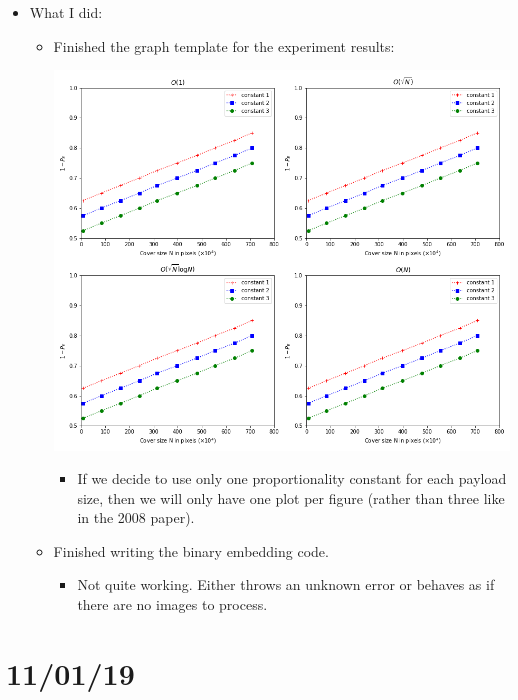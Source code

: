 \documentclass[11pt,a4paper]{report}
\begin{document}
\begin{itemize}

  \item What I did:
    \begin{itemize}
      \item Finished the graph template for the experiment results:
        \begin{center}
          \includegraphics[width=0.7\linewidth]{graph_template.png}
        \end{center}
        \begin{itemize}
          \item If we decide to use only one proportionality constant for each payload size, then we will only have one plot per figure (rather than three like in the 2008 paper).
        \end{itemize}
    
      \item Finished writing the binary embedding code.
        \begin{itemize}
          \item Not quite working. Either throws an unknown error or behaves as if there are no images to process.
        \end{itemize}
    \end{itemize}

\end{itemize}

\section{11/01/19}
\end{document}
